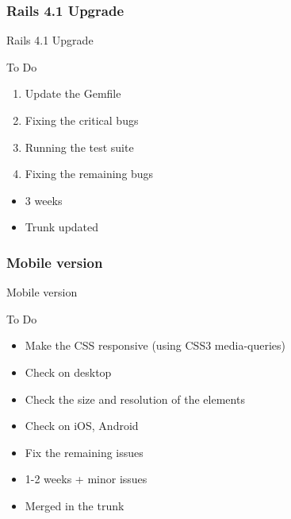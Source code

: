 \documentclass[10pt,a4paper]{beamer}
\begin{document}
\subsubsection{Rails 4.1 Upgrade}

\begin{frame}{Rails 4.1 Upgrade}
  \begin{block}{To Do}
    \begin{enumerate}
      \item Update the Gemfile
      \item Fixing the critical bugs
      \item Running the test suite
      \item Fixing the remaining bugs
    \end{enumerate}
  \end{block}
  
  \begin{block}{}
    \begin{itemize}
      \item 3 weeks
      \item Trunk updated
    \end{itemize}
  \end{block}
\end{frame}

\subsubsection{Mobile version}

\begin{frame}{Mobile version}
  \begin{block}{To Do}
    \begin{itemize}
      \item Make the CSS responsive (using CSS3 media-queries)
      \item Check on desktop 
      \item Check the size and resolution of the elements
      \item Check on iOS, Android
      \item Fix the remaining issues 
    \end{itemize}
  \end{block}
  
  \begin{block}{}
    \begin{itemize}
      \item 1-2 weeks + minor issues
      \item Merged in the trunk
    \end{itemize}
  \end{block}
\end{frame}
\end{document}
